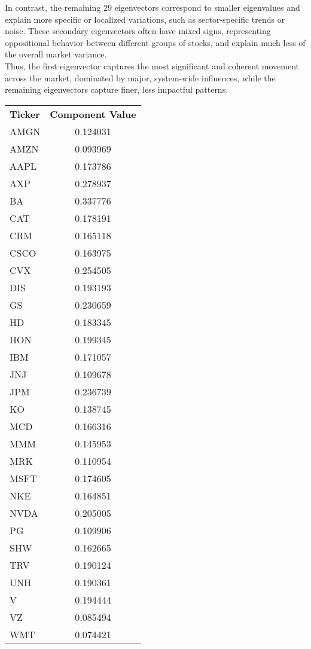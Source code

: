 \documentclass{report}
\begin{document}
In contrast, the remaining 29 eigenvectors correspond to smaller eigenvalues and explain more specific or localized variations, such as sector-specific trends or noise. These secondary eigenvectors often have mixed signs, representing oppositional behavior between different groups of stocks, and explain much less of the overall market variance. \\

Thus, the first eigenvector captures the most significant and coherent movement across the market, dominated by major, system-wide influences, while the remaining eigenvectors capture finer, less impactful patterns. \\
\newpage

\begin{table}[h]
    \centering
    \begin{tabular}{l c}
        \textbf{Ticker} & \textbf{Component Value} \\
        AMGN & 0.124031 \\
        AMZN & 0.093969 \\
        AAPL & 0.173786 \\
        AXP  & 0.278937 \\
        BA   & 0.337776 \\
        CAT  & 0.178191 \\
        CRM  & 0.165118 \\
        CSCO & 0.163975 \\
        CVX  & 0.254505 \\
        DIS  & 0.193193 \\
        GS   & 0.230659 \\
        HD   & 0.183345 \\
        HON  & 0.199345 \\
        IBM  & 0.171057 \\
        JNJ  & 0.109678 \\
        JPM  & 0.236739 \\
        KO   & 0.138745 \\
        MCD  & 0.166316 \\
        MMM  & 0.145953 \\
        MRK  & 0.110954 \\
        MSFT & 0.174605 \\
        NKE  & 0.164851 \\
        NVDA & 0.205005 \\
        PG   & 0.109906 \\
        SHW  & 0.162665 \\
        TRV  & 0.190124 \\
        UNH  & 0.190361 \\
        V    & 0.194444 \\
        VZ   & 0.085494 \\
        WMT  & 0.074421 \\
    \end{tabular}
\end{table}
\end{document}
